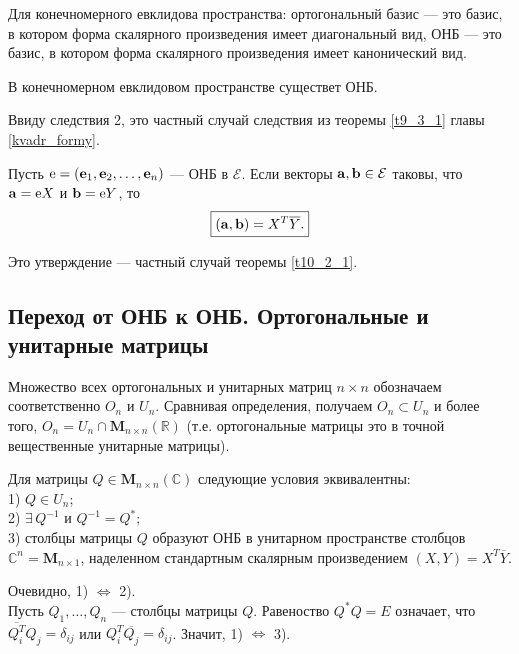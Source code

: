 \begin{sled2}
Для конечномерного евклидова пространства: ортогональный базис --- это базис, в котором форма скалярного произведения имеет диагональный вид,
ОНБ --- это базис, в котором форма скалярного произведения имеет канонический вид. 
\end{sled2}

\begin{sled3}
В конечномерном евклидовом пространстве существет ОНБ.
\end{sled3}
\dok %
Ввиду следствия 2, это частный случай следствия из теоремы \ref{t9_3_1} главы \ref{kvadr_formy}.
\edok

\begin{sled4}
Пусть $\mathrm{e} = (\mathbf{e}_1, \mathbf{e}_2, \ldots, \mathbf{e}_n)$ --- ОНБ в $\mathcal{E}$.
Если векторы $\mathbf{a}, \mathbf{b} \in \mathcal{E}$ таковы, что
$\mathbf{a} = \mathrm{e} X$ и $\mathbf{b} = \mathrm{e} Y$, то $$\boxed{(\mathbf{a}, \mathbf{b}) = X^T\overline{Y}.}$$
\end{sled4}
\dok 
Это утверждение --- частный случай теоремы \ref{t10_2_1}.
\edok

\subsection{Переход от ОНБ к ОНБ. Ортогональные и унитарные матрицы}



Множество всех ортогональных и унитарных матриц $n\times n$  обозначаем соответственно $O_n$ и $U_n$.
Сравнивая определения, получаем  $O_n\subset U_n$ и более того, $O_n= U_n\cap \mathbf{M}_{n\times n} (\mathbb{R})$
(т.е. ортогональные матрицы это в точной вещественные унитарные матрицы).


\begin{predl}\label{p10_2_100} 
Для матрицы $Q\in \mathbf{M}_{n\times n} (\mathbb{C}) $
следующие условия эквивалентны: \\
1) $Q\in U_n$;\\
2) $\exists \, Q^{-1} $ и $Q^{-1} = Q^{*}$;\\
3) столбцы матрицы $Q$ образуют ОНБ в унитарном пространстве столбцов $\mathbb{C}^n = \mathbf{M}_{n\times 1}$, наделенном
стандартным скалярным произведением $(X, Y)=X^T\overline{Y}$.
\end{predl}
\dok Очевидно, 1) $\Leftrightarrow$ 2).\\
Пусть $Q_1, \ldots, Q_n$ --- столбцы матрицы $Q$. Равеноство $Q^{*}Q=E$ означает, что $\overline {Q_i^{T}} Q_j = \delta_{ij}$ или 
$Q_i^{T} \overline {Q_j} = \delta_{ij}$. Значит, 1) $\Leftrightarrow$ 3).
\edok

